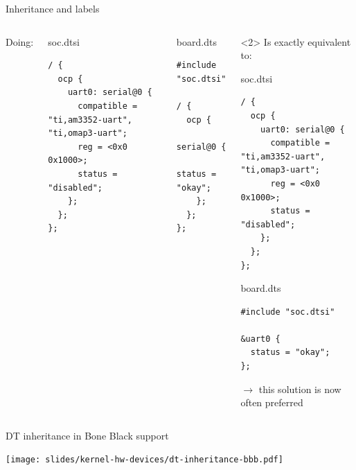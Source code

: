 \begin{frame}[fragile]{Inheritance and labels}

  \begin{columns}[t]
    Doing:
    \begin{block}{soc.dtsi}
      {\tiny
\begin{verbatim}
/ {
  ocp {
    uart0: serial@0 {
      compatible = "ti,am3352-uart", "ti,omap3-uart";
      reg = <0x0 0x1000>;
      status = "disabled";
    };
  };
};
\end{verbatim}
      }
    \end{block}

    \begin{block}{board.dts}
      {\tiny
\begin{verbatim}
#include "soc.dtsi"

/ {
  ocp {
    serial@0 {
      status = "okay";
    };
  };
};
\end{verbatim}
      }
    \end{block}

    \begin{onlyenv}<2>
    Is exactly equivalent to:

    \begin{block}{soc.dtsi}
      {\tiny
\begin{verbatim}
/ {
  ocp {
    uart0: serial@0 {
      compatible = "ti,am3352-uart", "ti,omap3-uart";
      reg = <0x0 0x1000>;
      status = "disabled";
    };
  };
};
\end{verbatim}
      }
    \end{block}

    \begin{block}{board.dts}
      {\tiny
\begin{verbatim}
#include "soc.dtsi"

&uart0 {
  status = "okay";
};
\end{verbatim}
        }
      \end{block}

      $\rightarrow$ this solution is now often preferred
      \end{onlyenv}
  \end{columns}

\end{frame}

\begin{frame}{DT inheritance in Bone Black support}
  \begin{center}
    \texttt{[image: slides/kernel-hw-devices/dt-inheritance-bbb.pdf]}
  \end{center}
\end{frame}


